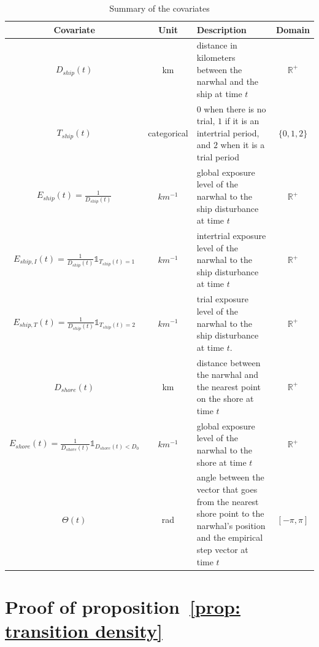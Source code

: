 \documentclass[11pt]{article}
\newcommand {\R}{\mathbb{R}}
\newcommand {\1}{\mathbb{1}}
\theoremstyle{definition}
\theoremstyle{remark}
\theoremstyle{remark}
\begin{document}
\begin{table}[H]
	\centering
	\begin{tabular}{|c|c|p{8cm}|c|}
		\hline
		Covariate & Unit & Description & Domain \\
		\hline
		$D_{ship}(t)$ & km & distance in kilometers between the narwhal and the ship at time $t$ & $\R^+$ \\
		\hline
		$T_{ship}(t)$  & categorical & $0$ when there is no trial, $1$ if it is an intertrial period, and $2$ when it is a trial period & $\{0,1,2\}$\\
		\hline
		$E_{ship}(t)=\frac{1}{D_{ship}(t)}$ & $km^{-1}$ & global exposure level of the narwhal to the ship disturbance at time $t$ & $\R^+$ \\
		\hline
		$E_{ship,I}(t)=\frac{1}{D_{ship}(t)}\mathbb{1}_{T_{ship}(t)=1}$& $km^{-1}$ & intertrial exposure level of the narwhal to the ship disturbance at time $t$ & $\R^+$ \\
		\hline
		$E_{ship,T}(t)=\frac{1}{D_{ship}(t)}\mathbb{1}_{T_{ship}(t)=2}$ & $km^{-1}$ & trial exposure level of the narwhal to the ship disturbance at time $t$. & $\R^+$\\
		\hline
		$D_{shore}(t)$ & km & distance between the narwhal and the nearest point on the shore at time $t$ & $\R^+$ \\
		\hline
		$E_{shore}(t)=\frac{1}{D_{shore}(t)} \1_{D_{shore}(t)<D_0}$ & $km^{-1}$ & global exposure level of the narwhal to the shore at time $t$ & $\R^+$ \\
		\hline
		$\Theta(t)$ & rad & angle between the vector that goes from the nearest shore point to the narwhal's position and the empirical step vector at time $t$  & $[-\pi,\pi]$ \\
		\hline 
	\end{tabular}
	\caption{Summary of the covariates}
	\label{tab: covariates}
\end{table}


\section{Proof of proposition~\ref{prop: transition density}}
\label{section: transition density proof}
\end{document}

